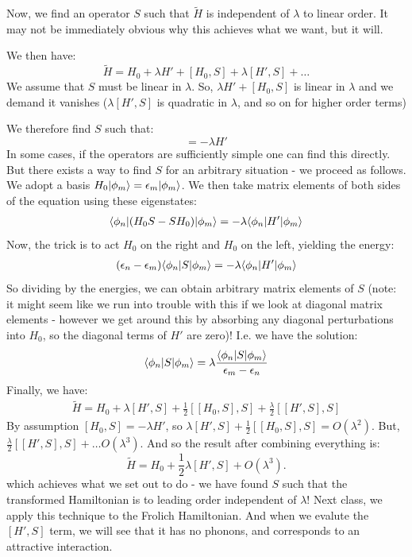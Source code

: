 Now, we find an operator $S$ such that $\tilde{H}$ is independent of $\lambda$ to linear order. It may not be immediately obvious why this achieves what we want, but it will.

We then have:
\begin{equation}
    \tilde{H} = H_0 + \lambda H' + [H_0, S] + \lambda[H', S] + \ldots 
\end{equation}
We assume that $S$ must be linear in $\lambda$. So, $\lambda H' + [H_0, S]$ is linear in $\lambda$ and we demand it vanishes ($\lambda[H', S]$ is quadratic in $\lambda$, and so on for higher order terms)

We therefore find $S$ such that:
\begin{equation}
    [H_0, S] = -\lambda H'
\end{equation}
In some cases, if the operators are sufficiently simple one can find this directly. But there exists a way to find $S$ for an arbitrary situation - we proceed as follows. We adopt a basis $H_0\lvert \phi_m \rangle = \epsilon_m\lvert \phi_m \rangle$. We then take matrix elements of both sides of the equation using these eigenstates:
\begin{align*}
    \langle \phi_n \rvert(H_0S - SH_0)\lvert \phi_m \rangle = -\lambda \langle \phi_n \rvert H'\lvert \phi_m \rangle
\end{align*}
Now, the trick is to act $H_0$ on the right and $H_0$ on the left, yielding the energy:
\begin{align*}
    (\epsilon_n - \epsilon_m)\langle \phi_n \rvert S\lvert \phi_m \rangle = -\lambda \langle \phi_n \rvert H'\lvert \phi_m \rangle
\end{align*}
So dividing by the energies, we can obtain arbitrary matrix elements of $S$ (note: it might seem like we run into trouble with this if we look at diagonal matrix elements - however we get around this by absorbing any diagonal perturbations into $H_0$, so the diagonal terms of $H'$ are zero)! I.e. we have the solution:
\begin{equation}
    \langle \phi_n \rvert S\lvert \phi_m \rangle = \lambda\frac{\langle \phi_n \rvert S\lvert \phi_m \rangle}{\epsilon_m - \epsilon_n}
\end{equation}
Finally, we have:
\begin{align*}
    \tilde{H} = H_0 + \lambda[H', S] + \frac{1}{2}[[H_0, S], S] + \frac{\lambda}{2}[[H', S], S]
\end{align*}
By assumption $[H_0, S] = -\lambda H'$, so $\lambda[H', S] + \frac{1}{2}[[H_0, S], S] = O(\lambda^2)$. But, $\frac{\lambda}{2}[[H', S], S] + \ldots O(\lambda^3)$. And so the result after combining everything is:
\begin{equation}
    \tilde{H} = H_0 + \frac{1}{2}\lambda [H',S] + O(\lambda^3).
\end{equation}
which achieves what we set out to do - we have found $S$ such that the transformed Hamiltonian is to leading order independent of $\lambda$! Next class, we apply this technique to the Frolich Hamiltonian. And when we evalute the $[H', S]$ term, we will see that it has no phonons, and corresponds to an attractive interaction.